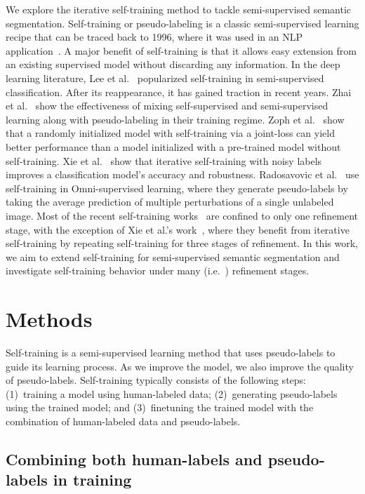 \documentclass[10pt, conference, compsocconf]{IEEEtran}
\begin{document}
We explore the iterative self-training method to tackle semi-supervised semantic segmentation. 
Self-training or pseudo-labeling is a classic semi-supervised learning recipe that can be traced back to 1996, where it was used in an NLP application~\cite{yarowsky1995unsupervised}. A major benefit of self-training is that it allows easy extension from an existing supervised model without discarding any information.
In the deep learning literature, Lee et al.~\cite{lee2013pseudo} popularized self-training in semi-supervised classification. After its reappearance, it has gained traction in recent years. Zhai et al.~\cite{zhai2019s4l} show the effectiveness of mixing self-supervised and semi-supervised learning along with pseudo-labeling in their training regime. Zoph et al.~\cite{zoph2020rethinking} show that a randomly initialized model with self-training via a joint-loss can yield better performance than a model initialized with a pre-trained model without self-training. Xie et al.~\cite{xie2020self} show that iterative self-training with noisy labels improves a classification model's accuracy and robustness.
Radosavovic et al.~\cite{radosavovic2018data} use self-training in Omni-supervised learning, where they generate pseudo-labels by taking the average prediction of multiple perturbations of a single unlabeled image.
Most of the recent self-training works~\cite{lee2013pseudo,radosavovic2018data,zhai2019s4l,zoph2020rethinking} are confined to only one refinement stage, with the exception of
Xie et al.'s work~\cite{xie2020self}, where they benefit from iterative self-training by repeating self-training for three stages of refinement.
In this work, we aim to extend self-training for semi-supervised semantic segmentation and investigate self-training behavior under many (i.e.~) refinement stages.

\section{Methods}\label{sec:methods}

Self-training is a semi-supervised learning method that uses pseudo-labels to guide its learning process. As we improve the model, we also improve the quality of pseudo-labels. Self-training typically consists of the following steps: (1)~training a model using human-labeled data; (2)~generating pseudo-labels using the trained model; and (3)~finetuning the trained model with the combination of human-labeled data and pseudo-labels.

\subsection{Combining both human-labels and pseudo-labels in training}\label{sec1}
\end{document}
